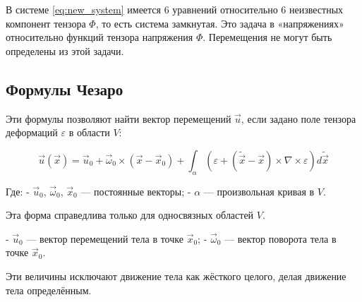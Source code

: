 В системе \eqref{eq:new_system} имеется 6 уравнений относительно 6 неизвестных компонент тензора \( \Phi \), то есть система замкнутая. Это задача в «напряжениях» относительно функций тензора напряжения \( \Phi \). Перемещения не могут быть определены из этой задачи.

\subsection*{Формулы Чезаро}
Эти формулы позволяют найти вектор перемещений \( \vec{u} \), если задано поле тензора деформаций \( \varepsilon \) в области \( V \):

\begin{equation}\label{eq:cesaro_formulas}
    \vec{u}(\vec{x}) = \vec{u}_0 + \vec{\omega}_0 \times (\vec{x} - \vec{x}_0) + 
    \int_{\alpha} \left( \varepsilon + (\tilde{\vec{x}} - \vec{x}) \times \nabla \times \varepsilon \right) d\tilde{\vec{x}}
\end{equation}

Где:
- \( \vec{u}_0 \), \( \vec{\omega}_0 \), \( \vec{x}_0 \) — постоянные векторы;
- \( \alpha \) — произвольная кривая в \( V \).

Эта форма справедлива только для односвязных областей \( V \).

- \( \vec{u}_0 \) — вектор перемещений тела в точке \( \vec{x}_0 \);
- \( \vec{\omega}_0 \) — вектор поворота тела в точке \( \vec{x}_0 \).

Эти величины исключают движение тела как жёсткого целого, делая движение тела определённым.